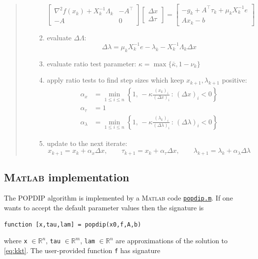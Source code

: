 \documentclass[11pt]{article}
\newcommand{\RR}{\mathbb{R}}
\newcommand{\grad}{\nabla}
\newcommand{\Matlab}{\textsc{Matlab}\xspace}
\begin{document}
\begin{quote}
\begin{itemize}
\begin{enumerate}
    $$\begin{bmatrix}
\grad^2 f(x_k) + X_k^{-1}\Lambda_k & -A^\top \\
-A             & 0
\end{bmatrix}
\begin{bmatrix}
\Delta x \\
\Delta \tau
\end{bmatrix}
=
\begin{bmatrix}
-g_k + A^\top \tau_k + \mu_k X_k^{-1} e \\
A x_k - b
\end{bmatrix}$$
    \item evaluate $\Delta\Lambda$:
    $$\Delta\lambda = \mu_k X_k^{-1} e - \lambda_k - X_k^{-1} \Lambda_k \Delta x$$
    \item evaluate ratio test parameter: $\kappa = \max\{\bar\kappa,1-\nu_k\}$
    \item apply ratio tests to find step sizes which keep $x_{k+1},\lambda_{k+1}$ positive:
\begin{align*}
\alpha_x &= \min_{1\le i\le n} \left\{1, \,-\kappa \frac{(x_k)_i}{(\Delta x)_i} \,:\, (\Delta x)_i < 0\right\} \\
\alpha_\tau &= 1 \\
\alpha_\lambda &= \min_{1\le i\le n} \left\{1, \,-\kappa \frac{(\lambda_k)_i}{(\Delta \lambda)_i} \,:\, (\Delta \lambda)_i < 0\right\}
\end{align*}
    \item update to the next iterate:
   $$x_{k+1} = x_k + \alpha_x \Delta x, \qquad \tau_{k+1} = x_k + \alpha_\tau \Delta x, \qquad \lambda_{k+1} = \lambda_k + \alpha_\lambda \Delta \lambda$$
    \end{enumerate}
\end{itemize}
\end{quote}


\subsection*{\Matlab implementation}

The POPDIP algorithm is implemented by a \Matlab code \href{https://github.com/bueler/popdip/blob/main/matlab/popdip.m}{\texttt{popdip.m}}.  If one wants to accept the default parameter values then the signature is

\medskip
\centerline{\texttt{function [x,tau,lam] = popdip(x0,f,A,b)}}

\medskip
\noindent where \texttt{x} $\in\RR^n$, \texttt{tau} $\in\RR^m$, \texttt{lam} $\in\RR^n$ are approximations of the solution to \eqref{eq:kkt}.  The user-provided function \texttt{f} has signature
\end{document}
